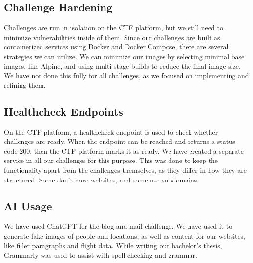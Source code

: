 \subsection{Challenge Hardening}


Challenges are run in isolation on the CTF platform, but we still need to minimize vulnerabilities inside of them. Since our challenges are built as containerized services using Docker and Docker Compose, there are several strategies we can utilize. We can minimize our images by selecting minimal base images, like Alpine, and using multi-stage builds to reduce the final image size. We have not done this fully for all challenges, as we focused on implementing and refining them.

\subsection{Healthcheck Endpoints}

On the CTF platform, a healthcheck endpoint is used to check whether challenges are ready. When the endpoint can be reached and returns a status code 200, then the CTF platform marks it as ready. We have created a separate service in all our challenges for this purpose. This was done to keep the functionality apart from the challenges themselves, as they differ in how they are structured. Some don't have websites, and some use subdomains.

\subsection{AI Usage}

We have used ChatGPT for the blog and mail challenge. We have used it to generate fake images of people and locations, as well as content for our websites, like filler paragraphs and flight data.
While writing our bachelor's thesis, Grammarly was used to assist with spell checking and grammar.

